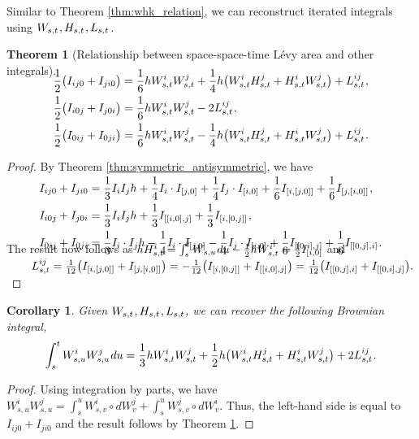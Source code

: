 \documentclass[sn-mathphys-num]{sn-jnl}%
\newtheorem{theorem}{Theorem}%
\newtheorem{corollary}{Corollary}
\newcommand{\m}{\hspace{0.25mm}}
\begin{document}
Similar to Theorem \ref{thm:whk_relation}, we can reconstruct iterated integrals using $W_{s,t}\m, H_{s,t}\m, L_{s,t}\m$.\medbreak
\begin{theorem}[Relationship between space-space-time L\'{e}vy area and other integrals]\label{thm:sst_levy_area}
\begin{align*}
&\\[-30pt]
\frac{1}{2}\big(I_{ij0} + I_{ji0}\big) & = \frac{1}{6}h W_{s,t}^{i}W_{s,t}^{j} 
    + \frac{1}{4}h\big(W_{s,t}^i H_{s,t}^j + H_{s,t}^i W_{s,t}^j\big)
    + L_{s,t}^{ij}\m,\\
\frac{1}{2}\big(I_{i0j} + I_{j0i}\big) & = \frac{1}{6}h W_{s,t}^{i}W_{s,t}^{j}
   - 2L_{s,t}^{ij}\m,\\
\frac{1}{2}\big(I_{0ij} + I_{0ji}\big) & = \frac{1}{6}h W_{s,t}^{i}W_{s,t}^{j}
	- \frac{1}{4}h\big(W_{s,t}^i H_{s,t}^j + H_{s,t}^i W_{s,t}^j\big)
    + L_{s,t}^{ij}\m.
\end{align*}
\end{theorem}
\begin{proof} By Theorem \ref{thm:symmetric_antisymmetric}, we have
\begin{align*}
&\\[-20pt]
I_{ij0} + I_{ji0} & =  \frac{1}{3}I_i I_j h 
    + \frac{1}{4} I_i\cdot I_{[j,0]} + \frac{1}{4} I_j\cdot I_{[i,0]}   
    + \frac{1}{6} I_{[i,[j,0]]} + \frac{1}{6} I_{[j,[i,0]]}\m,\\
I_{i0j} + I_{j0i} & =  \frac{1}{3}I_i I_j h
    + \frac{1}{3} I_{[[i,0], j]} 
    + \frac{1}{3} I_{[i,[0,j]]}\m,\\
I_{0ij} + I_{0ji} & = \frac{1}{3} I_i\cdot I_j h
    - \frac{1}{4} I_i\cdot I_{[j,0]} - \frac{1}{4} I_j\cdot I_{[i,0]}  
    + \frac{1}{6} I_{[[0,i], j]} + \frac{1}{6} I_{[[0,j], i]}\m.\\[-18pt]
\end{align*}
The result now follows as $h H_{s,t}^{i} = \int_s^t W_{s,u}\m du - \frac{1}{2}hW_{s,t}^i = \frac{1}{2}I_{[i,0]}$ and\\[6pt]
$\hspace*{7.5mm}L_{s,t}^{ij} = \frac{1}{12}\big(I_{[i,[j,0]]} + I_{[j,[i,0]]}\big) = -\frac{1}{12}\big(I_{[i,[0,j]]} + I_{[[i,0], j]}\big) = \frac{1}{12}\big(I_{[[0,j],i]} + I_{[[0,i],j]}\big).$
\end{proof}
\medbreak
\begin{corollary}\label{corr:simple_sst_levy}
Given $W_{s,t}\m, H_{s,t}\m,L_{s,t}$, we can recover the following Brownian integral,
\begin{align}\label{eq:simple_sst_levy}
\int_s^t W_{s,u}^i W_{s,u}^j\m du = \frac{1}{3}h W_{s,t}^{i}W_{s,t}^{j} 
    + \frac{1}{2}h\big(W_{s,t}^i H_{s,t}^j + H_{s,t}^i W_{s,t}^j\big)
    + 2L_{s,t}^{ij}\m.
\end{align}
\end{corollary}
\begin{proof}
Using integration by parts, we have $W_{s,u}^i W_{s,u}^j = \int_s^u W_{s,v}^i \circ dW_v^j + \int_s^u W_{s,v}^j \circ dW_v^i$. Thus, the left-hand side is equal to $I_{ij0} + I_{ji0}$ and the result follows by Theorem \ref{thm:sst_levy_area}.
\end{proof}
\end{document}
